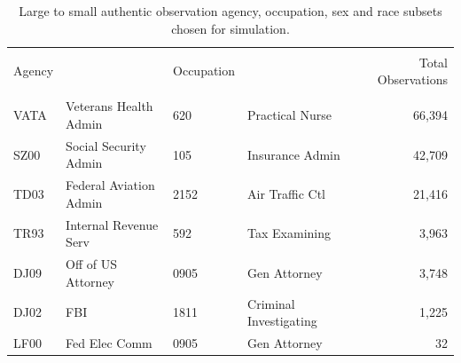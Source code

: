 \documentclass[10pt, letterpaper]{article}
\begin{document}
\begin{spacing}{1.0}
\begin{table}[h!]
    \centering
    \caption{Large to small authentic observation agency, occupation, sex and race subsets chosen for simulation.}
    \begin{tabular}{llllr}
      \hline\\[-10pt]
      Agency & & Occupation & & Total Observations \\ 
      \hline\\[-6pt]
      VATA & Veterans Health Admin & 620 & Practical Nurse & 66,394 \\
      SZ00 & Social Security Admin & 105 & Insurance Admin & 42,709 \\
      TD03 & Federal Aviation Admin & 2152 & Air Traffic Ctl & 21,416 \\
      TR93 & Internal Revenue Serv & 592 & Tax Examining & 3,963 \\ 
      DJ09 & Off of US Attorney & 0905 & Gen Attorney & 3,748 \\
      DJ02 & FBI & 1811 & Criminal Investigating & 1,225 \\
      LF00 & Fed Elec Comm & 0905 & Gen Attorney & 32 \\
      \hline
    \end{tabular}
    \label{table:AgencyOcc}
\end{table}

\clearpage


\end{spacing}
\end{document}
